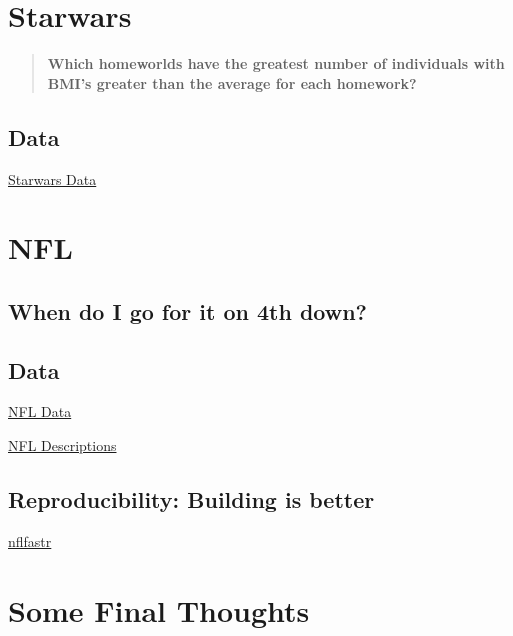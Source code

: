 \documentclass[
]{book}
\begin{document}
\hypertarget{starwars}{%
\chapter{Starwars}\label{starwars}}

\begin{quote}
\textbf{Which homeworlds have the greatest number of individuals with BMI's greater than the average for each homework?}
\end{quote}

\hypertarget{data}{%
\section{Data}\label{data}}

\href{https://github.com/tidyverse/dplyr/tree/main/data-raw}{Starwars Data}

\hypertarget{nfl}{%
\chapter{NFL}\label{nfl}}

\hypertarget{when-do-i-go-for-it-on-4th-down}{%
\section{When do I go for it on 4th down?}\label{when-do-i-go-for-it-on-4th-down}}

\hypertarget{data-1}{%
\section{Data}\label{data-1}}

\href{https://github.com/nflverse/nflverse-data/releases/tag/pbp}{NFL Data}

\href{https://www.nflfastr.com/articles/field_descriptions.html}{NFL Descriptions}

\hypertarget{reproducibility-building-is-better}{%
\section{Reproducibility: Building is better}\label{reproducibility-building-is-better}}

\href{https://www.nflfastr.com/}{nflfastr}

\hypertarget{some-final-thoughts}{%
\chapter{Some Final Thoughts}\label{some-final-thoughts}}
\end{document}

